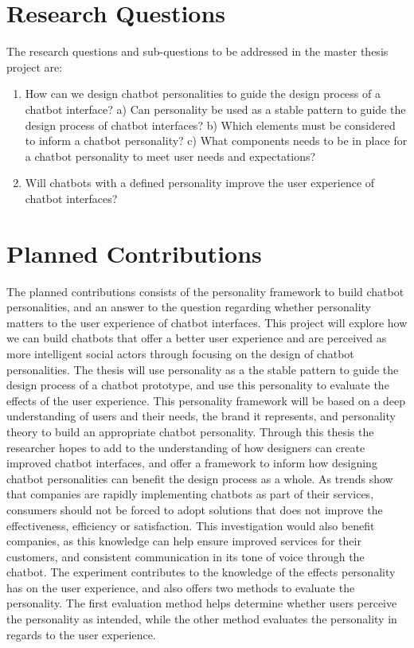 \vspace{5mm} %

\section{Research Questions}

The research questions and sub-questions to be addressed in the master thesis project are:

\begin{enumerate}
    \item How can we design chatbot personalities to guide the design process of a chatbot interface? 
        \subitem a) Can personality be used as a stable pattern to guide the design \subitem    process of chatbot interfaces?
        \subitem b) Which elements must be considered to inform a chatbot personality?
        \subitem c) What components needs to be in place for a chatbot personality to \subitem  meet user needs and expectations?
    \item Will chatbots with a defined personality improve the user experience of chatbot interfaces?
\end{enumerate}

\vspace{5mm} %

\section{Planned Contributions}
The planned contributions consists of the personality framework to build chatbot personalities, and an answer to the question regarding whether personality matters to the user experience of chatbot interfaces. This project will explore how we can build chatbots that offer a better user experience and are perceived as more intelligent social actors through focusing on the design of chatbot personalities. The thesis will use personality as a the stable pattern to guide the design process of a chatbot prototype, and use this personality to evaluate the effects of the user experience. This personality framework will be based on a deep understanding of users and their needs, the brand it represents, and personality theory to build an appropriate chatbot personality. Through this thesis the researcher hopes to add to the understanding of how designers can create improved chatbot interfaces, and offer a framework to inform how designing chatbot personalities can benefit the design process as a whole. As trends show that companies are rapidly implementing chatbots as part of their services, consumers should not be forced to adopt solutions that does not improve the effectiveness, efficiency or satisfaction. This investigation would also benefit companies, as this knowledge can help ensure improved services for their customers, and consistent communication in its tone of voice through the chatbot. The experiment contributes to the knowledge of the effects personality has on the user experience, and also offers two methods to evaluate the personality. The first evaluation method helps determine whether users perceive the personality as intended, while the other method evaluates the personality in regards to the user experience.

